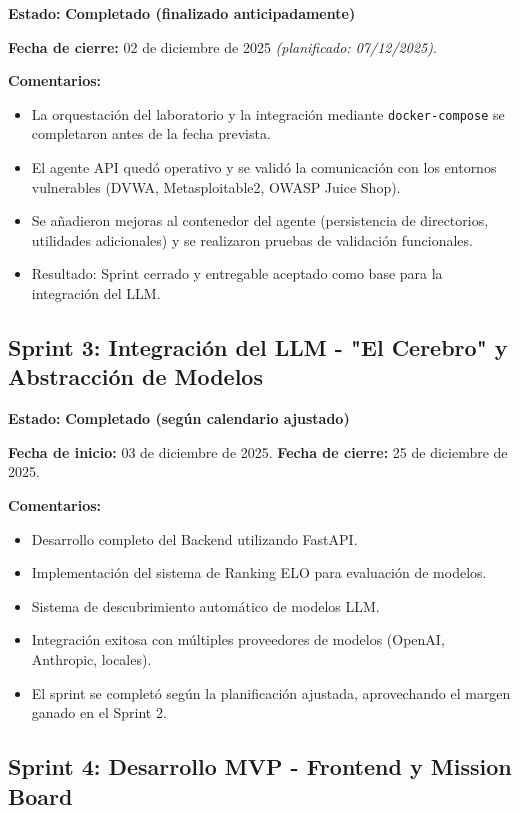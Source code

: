 \documentclass[12pt,a4paper]{article}
\begin{document}
\textbf{Estado:} \textcolor{early}{\textbf{Completado (finalizado anticipadamente)}}

\textbf{Fecha de cierre:} 02 de diciembre de 2025 \textit{(planificado: 07/12/2025)}.

\textbf{Comentarios:}
\begin{itemize}
    \item La orquestación del laboratorio y la integración mediante \texttt{docker-compose} se completaron antes de la fecha prevista.
    \item El agente API quedó operativo y se validó la comunicación con los entornos vulnerables (DVWA, Metasploitable2, OWASP Juice Shop).
    \item Se añadieron mejoras al contenedor del agente (persistencia de directorios, utilidades adicionales) y se realizaron pruebas de validación funcionales.
    \item Resultado: Sprint cerrado y entregable aceptado como base para la integración del LLM.
\end{itemize}

\subsection{Sprint 3: Integración del LLM - "El Cerebro" y Abstracción de Modelos}

\textbf{Estado:} \textcolor{ontime}{\textbf{Completado (según calendario ajustado)}}

\textbf{Fecha de inicio:} 03 de diciembre de 2025.
\textbf{Fecha de cierre:} 25 de diciembre de 2025.

\textbf{Comentarios:}
\begin{itemize}
    \item Desarrollo completo del Backend utilizando FastAPI.
    \item Implementación del sistema de Ranking ELO para evaluación de modelos.
    \item Sistema de descubrimiento automático de modelos LLM.
    \item Integración exitosa con múltiples proveedores de modelos (OpenAI, Anthropic, locales).
    \item El sprint se completó según la planificación ajustada, aprovechando el margen ganado en el Sprint 2.
\end{itemize}

\subsection{Sprint 4: Desarrollo MVP - Frontend y Mission Board}
\end{document}
